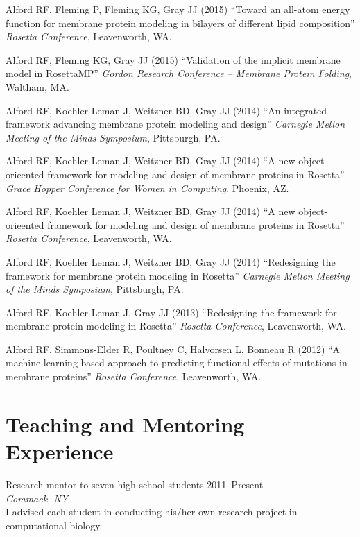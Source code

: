 \documentclass[11pt]{article}
\newcommand{\allcapsspacing}[1]{{\addfontfeature{LetterSpace=7.5}#1}}
\newcommand{\outreachitem}[4]{
{#1} \hfill {#2} \\
#3 \smallskip
#4 
\par\vspace{0.5\baselineskip}}
\newcommand{\researchitem}[4]{
\outreachitem{#1}{#2}{\textit{#3}}{\vspace{0\baselineskip}#4}}
\begin{document}
\begin{etaremune}
\item Alford RF, Fleming P, Fleming KG, Gray JJ (2015) ``Toward an all-atom energy function for membrane protein modeling in bilayers of different lipid composition'' \textit{Rosetta Conference}, Leavenworth, WA.
\item Alford RF, Fleming KG, Gray JJ (2015) ``Validation of the implicit membrane model in RosettaMP'' \textit{Gordon Research Conference -- Membrane Protein Folding}, Waltham, MA.
\item Alford RF, Koehler Leman J, Weitzner BD, Gray JJ (2014) ``An integrated framework advancing membrane protein modeling and design'' \textit{Carnegie Mellon Meeting of the Minds Symposium}, Pittsburgh, PA.
\item Alford RF, Koehler Leman J, Weitzner BD, Gray JJ (2014) ``A new object-orieented framework for modeling and design of membrane proteins in Rosetta'' \textit{Grace Hopper Conference for Women in Computing}, Phoenix, AZ.
\item Alford RF, Koehler Leman J, Weitzner BD, Gray JJ (2014) ``A new object-orieented framework for modeling and design of membrane proteins in Rosetta'' \textit{Rosetta Conference}, Leavenworth, WA.
\item Alford RF, Koehler Leman J, Weitzner BD, Gray JJ (2014) ``Redesigning the framework for membrane protein modeling in Rosetta'' \textit{Carnegie Mellon Meeting of the Minds Symposium}, Pittsburgh, PA.
\item Alford RF, Koehler Leman J, Gray JJ (2013) ``Redesigning the framework for membrane protein modeling in Rosetta'' \textit{Rosetta Conference}, Leavenworth, WA.
\item Alford RF, Simmons-Elder R, Poultney C, Halvorsen L, Bonneau R (2012) ``A machine-learning based approach to predicting functional effects of mutations in membrane proteins'' \textit{Rosetta Conference}, Leavenworth, WA.
\end{etaremune}

\section*{\allcapsspacing{Teaching and Mentoring Experience}}

\researchitem{Research mentor to seven high school students}{2011--Present}{Commack, NY}{\\I advised each student in conducting his/her own research project in computational biology.}
\end{document}
